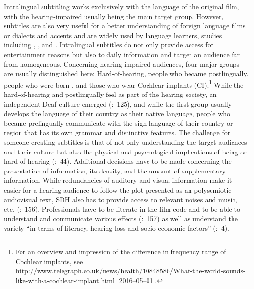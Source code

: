 Intralingual subtitling works exclusively with the language of the original film, with the hearing-impaired usually being the main target group. However,  subtitles are also very useful for a better understanding of foreign language films or dialects and accents and are widely used by language learners, studies including \citet{Danan2004}, \citet{Bianchi2007}, and \citet{remael2008}. Intralingual subtitles do not only provide access for entertainment reasons but also to daily information and target an audience far from homogeneous. Concerning hearing-impaired audiences, four major groups are usually distinguished here: Hard-of-hearing, people who became  postlingually, people who were born , and those who wear Cochlear implants (CI).\footnote{For an overview and impression of the difference in frequency range of Cochlear implants, see \url{http://www.telegraph.co.uk/news/health/10848586/What-the-world-sounds-like-with-a-cochlear-implant.html} [2016--05--01].} While the hard-of-hearing and postlingually  feel as part of the hearing society, an independent Deaf culture emerged (\citealt{Jungst2010}:~125), and while the first group usually develops the language of their country as their native language, people who became  prelingually communicate with the sign language of their country or region that has its own grammar and distinctive features. The challenge for someone creating  subtitles is that of not only understanding the target audiences and their culture but also the physical and psychological implications of being  or hard-of-hearing (\citealt{remael2007}:~44). Additional decisions have to be made concerning the presentation of information, its density, and the amount of supplementary information. While redundancies of auditory and visual information make it easier for a hearing audience to follow the plot presented as an polysemiotic audiovisual text, SDH also has to provide access to relevant noises and music, etc. (\citealt{neves2009}:~156). Professionals have to be literate in the film code and  to be able to understand and communicate various effects (\citealt{neves2009}:~157) as well as understand the variety “in terms of literacy, hearing loss and socio-economic factors” (\citealt{Itc1999}:~4).

